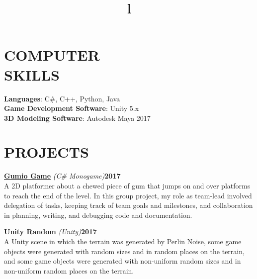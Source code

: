 \documentclass[line,margin]{res}
\begin{document}
\begin{resume}
\section{COMPUTER\\SKILLS}
\textbf{Languages}: C\#, C++, Python, Java\\
\textbf{Game Development Software}: Unity 5.x\\
\textbf{3D Modeling Software}: Autodesk Maya 2017
\section{PROJECTS}
\par
    \href{https://github.com/MaeveMonster/GumioGame}{\textbf{Gumio Game}}
    {\sl (C\# Monogame)}\hfill \textbf{2017}\\ 
    A 2D platformer about a chewed piece of gum that jumps on and over platforms to 
	reach the end of the level. In this group project, my role as team-lead involved delegation of tasks, keeping track of team goals and milestones, and collaboration in planning, writing, and debugging code and documentation.
	
	\par
    {\textbf{Unity Random}}
    {\sl (Unity)}\hfill \textbf{2017}\\ 
    A Unity scene in which the terrain was generated by Perlin Noise, some game objects were generated with random sizes and in random places on the terrain, and some game objects were generated with non-uniform random sizes and in non-uniform random places on the terrain.


\begin{format}
\title{l}\\
\\
\body\\
\end{format}

\end{resume}
\end{document}
